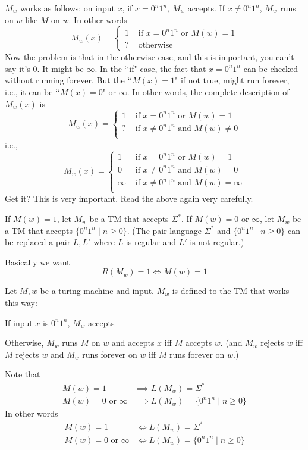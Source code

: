 $M_w$ works as follows: on input $x$, if $x = 0^n1^n$, $M_w$ accepts.
If $x \neq 0^n1^n$, $M_w$ runs on $w$ like $M$ on $w$.
In other words
\[
M_w(x) =
\begin{cases}
  1 &\text{ if } x = 0^n1^n \text{ or } M(w) = 1 \\
  ? &\text{ otherwise}
\end{cases}
\]
Now the problem is that in the otherwise case, and this is
important, you can't say it's $0$. It might be $\infty$.
In the \lq\lq if" case, the fact that $x = 0^n1^n$ can be
checked without running forever. But the \lq\lq $M(x) = 1$"
if not true, might run forever, i.e., it can be
\lq\lq $M(x) = 0$" or $\infty$.
In other words, the complete description of $M_w(x)$ is
\[
M_w(x) =
\begin{cases}
  1 &\text{ if } x = 0^n1^n \text{ or } M(w) = 1 \\
  ? &\text{ if } x \neq 0^n1^n \text{ and } M(w) \neq 0 \\
\end{cases}
\]
i.e.,
\[
M_w(x) =
\begin{cases}
  1 &\text{ if } x = 0^n1^n \text{ or } M(w) = 1 \\
  0 &\text{ if } x \neq 0^n1^n \text{ and } M(w) = 0 \\
  \infty &\text{ if } x \neq 0^n1^n \text{ and } M(w) = \infty \\
\end{cases}
\]
Get it? This is very important. Read the above again very carefully.

If $M(w) = 1$, let $M_w$ be a TM that accepts $\Sigma^*$.
If $M(w) = 0$ or $\infty$, let $M_w$ be a TM that accepts
$\{0^n 1^n \mid n \geq 0\}$.
(The pair language $\Sigma^*$ and $\{0^n 1^n \mid n \geq 0\}$
can be replaced a pair $L, L'$ where $L$ is regular
and $L'$ is not regular.)

Basically we want
\[
R(M_w) = 1 \iff M(w) = 1
\]

Let $M,w$ be a turing machine and input.
$M_w$ is defined to the TM that works this way:
\begin{tightlist}
\item If input $x$ is $0^n1^n$, $M_w$ accepts
\item Otherwise, $M_w$ runs $M$ on $w$ and accepts $x$ iff $M$ accepts $w$.
  (and
  $M_w$ rejects $w$ iff $M$ rejects $w$ and
  $M_w$ runs forever on $w$ iff $M$ runs forever on $w$.) 
\end{tightlist}
Note that
\begin{align*}
M(w) = 1 &\implies L(M_w) = \Sigma^* \\
M(w) = 0 \text{ or } \infty &\implies L(M_w) = \{ 0^n1^n \mid n \geq 0 \}
\end{align*}
In other words
\begin{align*}
M(w) = 1 &\iff L(M_w) = \Sigma^* \\
M(w) = 0 \text{ or } \infty &\iff L(M_w) = \{ 0^n1^n \mid n \geq 0 \}
\end{align*}

